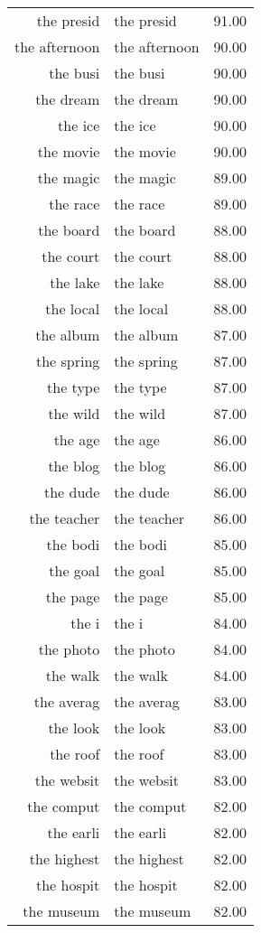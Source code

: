 \begin{table}[ht]
\begin{tabular}{rlr}
  the presid & the presid & 91.00 \\ 
  the afternoon & the afternoon & 90.00 \\ 
  the busi & the busi & 90.00 \\ 
  the dream & the dream & 90.00 \\ 
  the ice & the ice & 90.00 \\ 
  the movie & the movie & 90.00 \\ 
  the magic & the magic & 89.00 \\ 
  the race & the race & 89.00 \\ 
  the board & the board & 88.00 \\ 
  the court & the court & 88.00 \\ 
  the lake & the lake & 88.00 \\ 
  the local & the local & 88.00 \\ 
  the album & the album & 87.00 \\ 
  the spring & the spring & 87.00 \\ 
  the type & the type & 87.00 \\ 
  the wild & the wild & 87.00 \\ 
  the age & the age & 86.00 \\ 
  the blog & the blog & 86.00 \\ 
  the dude & the dude & 86.00 \\ 
  the teacher & the teacher & 86.00 \\ 
  the bodi & the bodi & 85.00 \\ 
  the goal & the goal & 85.00 \\ 
  the page & the page & 85.00 \\ 
  the i & the i & 84.00 \\ 
  the photo & the photo & 84.00 \\ 
  the walk & the walk & 84.00 \\ 
  the averag & the averag & 83.00 \\ 
  the look & the look & 83.00 \\ 
  the roof & the roof & 83.00 \\ 
  the websit & the websit & 83.00 \\ 
  the comput & the comput & 82.00 \\ 
  the earli & the earli & 82.00 \\ 
  the highest & the highest & 82.00 \\ 
  the hospit & the hospit & 82.00 \\ 
  the museum & the museum & 82.00 \\ 

\end{tabular}
\end{table}
